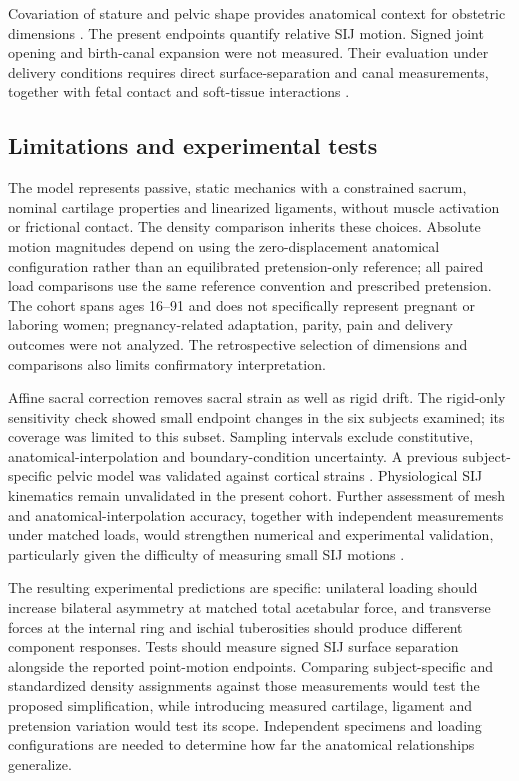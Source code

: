 Covariation of stature and pelvic shape provides anatomical context for obstetric dimensions \citep{Fischer2015}. The present endpoints quantify relative SIJ motion. Signed joint opening and birth-canal expansion were not measured. Their evaluation under delivery conditions requires direct surface-separation and canal measurements, together with fetal contact and soft-tissue interactions \citep{ChenGrimm2021}.

\subsection*{Limitations and experimental tests}
The model represents passive, static mechanics with a constrained sacrum, nominal cartilage properties and linearized ligaments, without muscle activation or frictional contact. The density comparison inherits these choices. Absolute motion magnitudes depend on using the zero-displacement anatomical configuration rather than an equilibrated pretension-only reference; all paired load comparisons use the same reference convention and prescribed pretension. The cohort spans ages 16--91 and does not specifically represent pregnant or laboring women; pregnancy-related adaptation, parity, pain and delivery outcomes were not analyzed. The retrospective selection of dimensions and comparisons also limits confirmatory interpretation.

Affine sacral correction removes sacral strain as well as rigid drift. The rigid-only sensitivity check showed small endpoint changes in the six subjects examined; its coverage was limited to this subset. Sampling intervals exclude constitutive, anatomical-interpolation and boundary-condition uncertainty. A previous subject-specific pelvic model was validated against cortical strains \citep{Anderson2005}. Physiological SIJ kinematics remain unvalidated in the present cohort. Further assessment of mesh and anatomical-interpolation accuracy, together with independent measurements under matched loads, would strengthen numerical and experimental validation, particularly given the difficulty of measuring small SIJ motions \citep{Goode2008}.

The resulting experimental predictions are specific: unilateral loading should increase bilateral asymmetry at matched total acetabular force, and transverse forces at the internal ring and ischial tuberosities should produce different component responses. Tests should measure signed SIJ surface separation alongside the reported point-motion endpoints. Comparing subject-specific and standardized density assignments against those measurements would test the proposed simplification, while introducing measured cartilage, ligament and pretension variation would test its scope. Independent specimens and loading configurations are needed to determine how far the anatomical relationships generalize.
